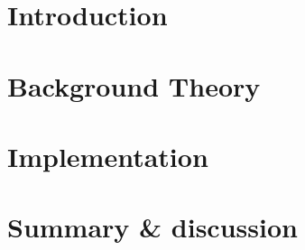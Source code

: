 \documentclass[11pt,a4paper,bibtotoc,idxtotoc,headsepline,footsepline,footexclude,DIV13,oneside]{scrbook}
\begin{document}
	\frontmatter
	
	
%	
%	
	
	
%	
	
	
	
	
	
	
	
	

	\tableofcontents
   	

	\mainmatter
	
	
		\chapter{Introduction}
		\label{chapter:Introduction}
		
		
		
		\chapter{Background Theory}
		\label{chapter:Background}
		
		
		
		\chapter{Implementation}
		\label{chapter:Implementation}		
		
		
		\chapter{Summary \& discussion}
		\label{chapter:Discussion}		
		
		
\end{document}
